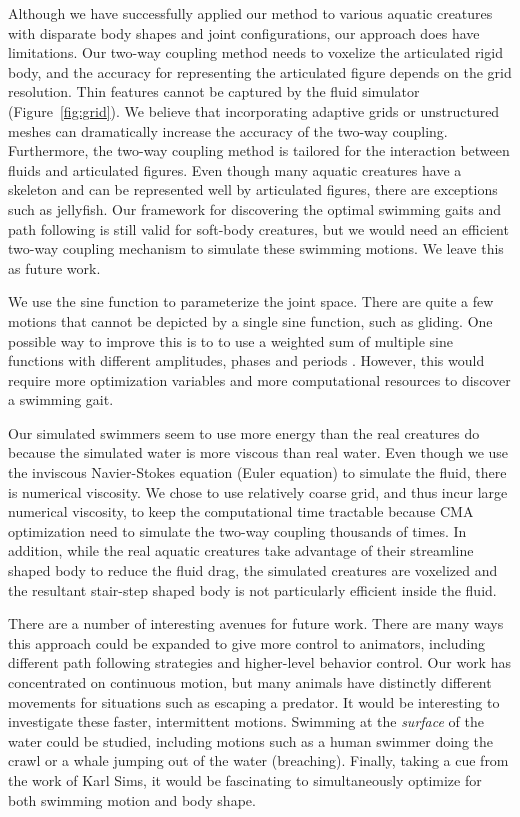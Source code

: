 Although we have successfully applied our method to various aquatic
creatures with disparate body shapes and joint configurations, our approach does
have limitations. Our two-way coupling method needs to voxelize the articulated rigid body,
and the accuracy for representing the articulated figure depends on the grid
resolution. Thin features cannot be captured by the fluid simulator (Figure~\ref{fig:grid}). We believe that incorporating adaptive grids
\cite{Losasso04Octree} or unstructured meshes
\cite{Brochu10MatchingElement,klingner2006mesh} can dramatically increase
the accuracy of the two-way coupling. Furthermore, the two-way coupling
method is tailored for the interaction between fluids and articulated
figures. Even though many aquatic creatures have a skeleton and can be
represented well by articulated figures, there are exceptions such as
jellyfish. Our framework for discovering the optimal swimming gaits and
path following is still valid for soft-body creatures, but we would need
an efficient two-way coupling mechanism to simulate these swimming
motions. We leave this as future work.

We use the sine function to parameterize the joint space. There
are quite a few motions that cannot be depicted by a single sine function,
such as gliding. One possible way to improve this is to to use a weighted
sum of multiple sine functions with different amplitudes, phases and
periods \cite{Grzeszczuk95automatedlearning}. However, this would require more
optimization variables and more computational resources to discover a
swimming gait.

Our simulated swimmers seem to use more energy than the real creatures do because the simulated water is more viscous than real water. Even though we use the inviscous Navier-Stokes equation (Euler equation) to simulate the fluid, there is numerical viscosity. We chose to use relatively coarse grid, and thus incur large numerical viscosity, to keep the computational time tractable because CMA optimization need to simulate the two-way coupling thousands of times. In addition, while the real aquatic creatures take advantage of their streamline shaped body to reduce the fluid drag, the simulated creatures are voxelized and the resultant stair-step shaped body is not particularly efficient inside the fluid.

There are a number of interesting avenues for future work.  There are many
ways this approach could be expanded to give more control to animators,
including different path following strategies and higher-level behavior
control.  Our work has concentrated on continuous motion, but many animals
have distinctly different movements for situations such as escaping a
predator.  It would be interesting to investigate these faster, intermittent
motions.  Swimming at the \emph{surface} of the water could be studied,
including motions such as a human swimmer doing the crawl or a whale jumping
out of the water (breaching).  Finally, taking a cue from the work of Karl
Sims, it would be fascinating to simultaneously optimize for both swimming
motion and body shape.
